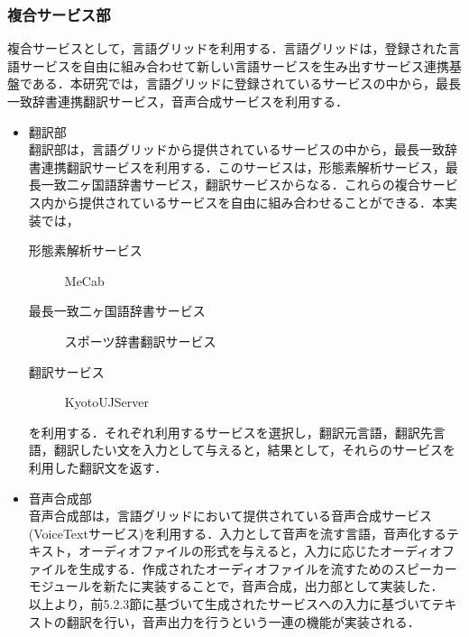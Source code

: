 \documentclass{kuisthesis}			%
\begin{document}
\subsubsection{複合サービス部}
複合サービスとして，言語グリッドを利用する．言語グリッドは，登録された言語サービスを自由に組み合わせて新しい言語サービスを生み出すサービス連携基盤である．本研究では，言語グリッドに登録されているサービスの中から，最長一致辞書連携翻訳サービス，音声合成サービスを利用する．
\begin{itemize}
\item 翻訳部\\
翻訳部は，言語グリッドから提供されているサービスの中から，最長一致辞書連携翻訳サービスを利用する．このサービスは，形態素解析サービス，最長一致二ヶ国語辞書サービス，翻訳サービスからなる．これらの複合サービス内から提供されているサービスを自由に組み合わせることができる．本実装では，
\begin{description}
\item[形態素解析サービス] MeCab
\item[最長一致二ヶ国語辞書サービス] スポーツ辞書翻訳サービス
\item[翻訳サービス] KyotoUJServer
\end{description}
を利用する．それぞれ利用するサービスを選択し，翻訳元言語，翻訳先言語，翻訳したい文を入力として与えると，結果として，それらのサービスを利用した翻訳文を返す．
\item 音声合成部\\
音声合成部は，言語グリッドにおいて提供されている音声合成サービス(VoiceTextサービス)を利用する．入力として音声を流す言語，音声化するテキスト，オーディオファイルの形式を与えると，入力に応じたオーディオファイルを生成する．作成されたオーディオファイルを流すためのスピーカーモジュールを新たに実装することで，音声合成，出力部として実装した．\\
以上より，前5.2.3節に基づいて生成されたサービスへの入力に基づいてテキストの翻訳を行い，音声出力を行うという一連の機能が実装される．
\end{itemize}
\end{document}
